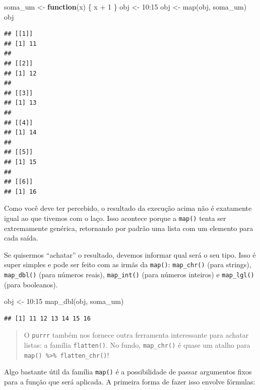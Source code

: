 \documentclass[
]{book}
\newenvironment{Shaded}{\begin{snugshade}}{\end{snugshade}}
\newcommand{\ControlFlowTok}[1]{\textcolor[rgb]{0.13,0.29,0.53}{\textbf{#1}}}
\newcommand{\DecValTok}[1]{\textcolor[rgb]{0.00,0.00,0.81}{#1}}
\newcommand{\FunctionTok}[1]{\textcolor[rgb]{0.00,0.00,0.00}{#1}}
\newcommand{\NormalTok}[1]{#1}
\newcommand{\OtherTok}[1]{\textcolor[rgb]{0.56,0.35,0.01}{#1}}
\newcommand{\SpecialCharTok}[1]{\textcolor[rgb]{0.00,0.00,0.00}{#1}}
\begin{document}
\begin{Shaded}
\begin{Highlighting}[]
\NormalTok{soma\_um }\OtherTok{\textless{}{-}} \ControlFlowTok{function}\NormalTok{(x) \{ x }\SpecialCharTok{+} \DecValTok{1}\NormalTok{ \}}
\NormalTok{obj }\OtherTok{\textless{}{-}} \DecValTok{10}\SpecialCharTok{:}\DecValTok{15}
\NormalTok{obj }\OtherTok{\textless{}{-}} \FunctionTok{map}\NormalTok{(obj, soma\_um)}
\NormalTok{obj}
\end{Highlighting}
\end{Shaded}

\begin{verbatim}
## [[1]]
## [1] 11
## 
## [[2]]
## [1] 12
## 
## [[3]]
## [1] 13
## 
## [[4]]
## [1] 14
## 
## [[5]]
## [1] 15
## 
## [[6]]
## [1] 16
\end{verbatim}

Como você deve ter percebido, o resultado da execução acima não é exatamente
igual ao que tivemos com o laço. Isso acontece porque a \texttt{map()} tenta ser
extremamente genérica, retornando por padrão uma lista com um elemento para
cada saída.

Se quisermos ``achatar'' o resultado, devemos informar qual será o seu tipo. Isso
é super simples e pode ser feito com as irmãs da \texttt{map()}: \texttt{map\_chr()} (para
strings), \texttt{map\_dbl()} (para números reais), \texttt{map\_int()} (para números inteiros) e
\texttt{map\_lgl()} (para booleanos).

\begin{Shaded}
\begin{Highlighting}[]
\NormalTok{obj }\OtherTok{\textless{}{-}} \DecValTok{10}\SpecialCharTok{:}\DecValTok{15}
\FunctionTok{map\_dbl}\NormalTok{(obj, soma\_um)}
\end{Highlighting}
\end{Shaded}

\begin{verbatim}
## [1] 11 12 13 14 15 16
\end{verbatim}

\begin{quote}
O \texttt{purrr} também nos fornece outra ferramenta interessante para
achatar listas: a família \texttt{flatten()}. No fundo, \texttt{map\_chr()}
é quase um atalho para \texttt{map()\ \%\textgreater{}\%\ flatten\_chr()}!
\end{quote}

Algo bastante útil da família \texttt{map()} é a possibilidade de passar argumentos
fixos para a função que será aplicada. A primeira forma de fazer isso envolve
fórmulas:
\end{document}

